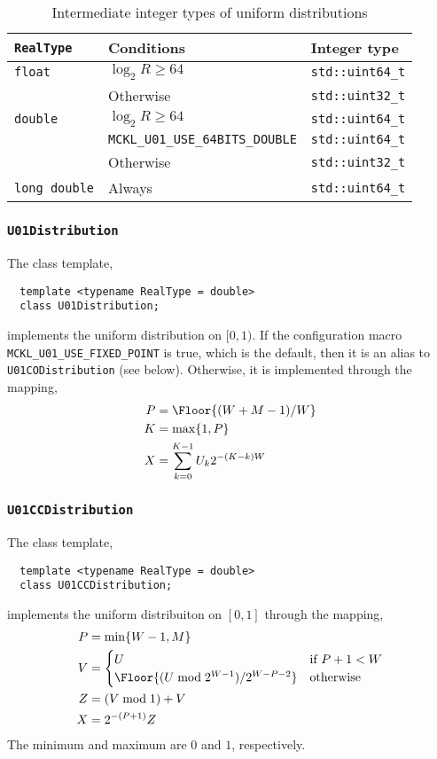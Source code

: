 \begin{table}
  \begin{tabularx}{\textwidth}{LlL}
    \toprule
    \verb|RealType| & Conditions & Integer type \\
    \midrule
    \verb|float|  & $\log_2 R \ge 64$   & \verb|std::uint64_t| \\
                  & Otherwise           & \verb|std::uint32_t| \\
    \verb|double| & $\log_2 R \ge 64$   & \verb|std::uint64_t| \\
    & \verb|MCKL_U01_USE_64BITS_DOUBLE| & \verb|std::uint64_t| \\
    & Otherwise                         & \verb|std::uint32_t| \\
    \verb|long double| & Always         & \verb|std::uint64_t| \\
    \bottomrule
  \end{tabularx}
  \caption{Intermediate integer types of uniform distributions}
  \label{tab:Intermediate integer types of uniform distributions}
\end{table}

\subsubsection{\texttt{U01Distribution}}

The class template,
\begin{Verbatim}
  template <typename RealType = double>
  class U01Distribution;
\end{Verbatim}
implements the uniform distribution on $[0, 1)$. If the configuration macro
\verb|MCKL_U01_USE_FIXED_POINT| is true, which is the default, then it is an
alias to \verb|U01CODistribution| (see below). Otherwise, it is implemented
through the mapping,
\begin{align*}
  P &= \Floor{(W + M - 1) / W} \\
  K &= \max\{1, P\} \\
  X &= \sum_{k=0}^{K - 1} U_k 2^{-(K - k)W}
\end{align*}

\subsubsection{\texttt{U01CCDistribution}}

The class template,
\begin{Verbatim}
  template <typename RealType = double>
  class U01CCDistribution;
\end{Verbatim}
implements the uniform distribuiton on $[0, 1]$ through the mapping,
\begin{align*}
  P &= \min\{W - 1, M\} \\
  V &= \begin{cases}
    U &\text{if } P + 1 < W \\
    \Floor{(U \bmod 2^{W - 1}) / 2^{W - P -2}} &\text{otherwise}
  \end{cases} \\
  Z &= (V \bmod 1) + V \\
  X &= 2^{-(P + 1)} Z
\end{align*}
The minimum and maximum are $0$ and $1$, respectively.

